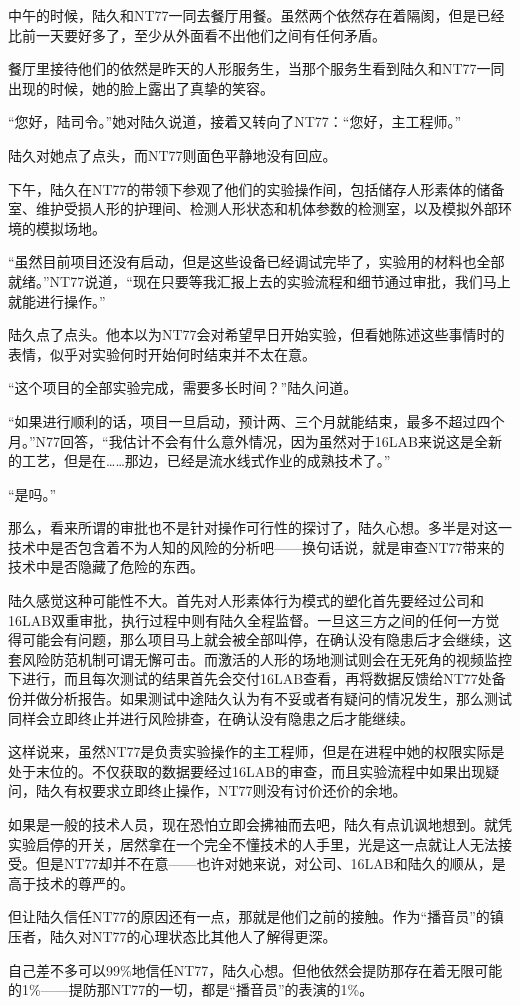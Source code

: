 中午的时候，陆久和NT77一同去餐厅用餐。虽然两个依然存在着隔阂，但是已经比前一天要好多了，至少从外面看不出他们之间有任何矛盾。

餐厅里接待他们的依然是昨天的人形服务生，当那个服务生看到陆久和NT77一同出现的时候，她的脸上露出了真挚的笑容。

“您好，陆司令。”她对陆久说道，接着又转向了NT77：“您好，主工程师。”

陆久对她点了点头，而NT77则面色平静地没有回应。

下午，陆久在NT77的带领下参观了他们的实验操作间，包括储存人形素体的储备室、维护受损人形的护理间、检测人形状态和机体参数的检测室，以及模拟外部环境的模拟场地。

“虽然目前项目还没有启动，但是这些设备已经调试完毕了，实验用的材料也全部就绪。”NT77说道，“现在只要等我汇报上去的实验流程和细节通过审批，我们马上就能进行操作。”

陆久点了点头。他本以为NT77会对希望早日开始实验，但看她陈述这些事情时的表情，似乎对实验何时开始何时结束并不太在意。

“这个项目的全部实验完成，需要多长时间？”陆久问道。

“如果进行顺利的话，项目一旦启动，预计两、三个月就能结束，最多不超过四个月。”N77回答，“我估计不会有什么意外情况，因为虽然对于16LAB来说这是全新的工艺，但是在……那边，已经是流水线式作业的成熟技术了。”

“是吗。”

那么，看来所谓的审批也不是针对操作可行性的探讨了，陆久心想。多半是对这一技术中是否包含着不为人知的风险的分析吧——换句话说，就是审查NT77带来的技术中是否隐藏了危险的东西。

陆久感觉这种可能性不大。首先对人形素体行为模式的塑化首先要经过公司和16LAB双重审批，执行过程中则有陆久全程监督。一旦这三方之间的任何一方觉得可能会有问题，那么项目马上就会被全部叫停，在确认没有隐患后才会继续，这套风险防范机制可谓无懈可击。而激活的人形的场地测试则会在无死角的视频监控下进行，而且每次测试的结果首先会交付16LAB查看，再将数据反馈给NT77处备份并做分析报告。如果测试中途陆久认为有不妥或者有疑问的情况发生，那么测试同样会立即终止并进行风险排查，在确认没有隐患之后才能继续。

这样说来，虽然NT77是负责实验操作的主工程师，但是在进程中她的权限实际是处于末位的。不仅获取的数据要经过16LAB的审查，而且实验流程中如果出现疑问，陆久有权要求立即终止操作，NT77则没有讨价还价的余地。

如果是一般的技术人员，现在恐怕立即会拂袖而去吧，陆久有点讥讽地想到。就凭实验启停的开关，居然拿在一个完全不懂技术的人手里，光是这一点就让人无法接受。但是NT77却并不在意——也许对她来说，对公司、16LAB和陆久的顺从，是高于技术的尊严的。

但让陆久信任NT77的原因还有一点，那就是他们之前的接触。作为“播音员”的镇压者，陆久对NT77的心理状态比其他人了解得更深。

自己差不多可以99\%地信任NT77，陆久心想。但他依然会提防那存在着无限可能的1\%——提防那NT77的一切，都是“播音员”的表演的1\%。